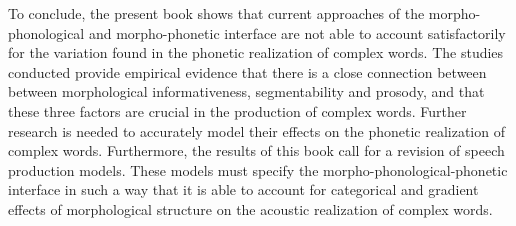 To conclude, the present book shows that current approaches of the morpho-phonological and morpho-phonetic interface are not able to account satisfactorily for the variation found in the phonetic realization of complex words. 
 The studies conducted provide empirical evidence that there is a close connection between between morphological informativeness, segmentability and prosody, and that these three factors are crucial in the production of complex words. 
Further research is needed to accurately model their effects on the phonetic realization of complex words.
Furthermore, the results of this book call for a revision of speech production models. These models must specify the morpho-phonological-phonetic interface in such a way that it is able to account for categorical and gradient effects of morphological structure on the acoustic realization of complex words.
